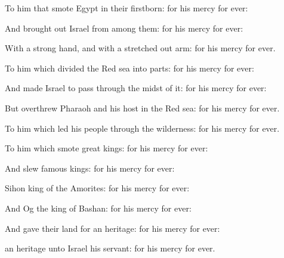 {\Q {}To him that
smote
Egypt in their
firstborn: for his
mercy
{} for
ever:


\par }{\Q {}And brought
out
Israel from
among them: for his
mercy
{} for
ever:


\par }{\Q {}With a
strong
hand, and with a stretched
out
arm: for his
mercy
{} for
ever.


\par }{\Q {}To him which
divided the
Red
sea into
parts: for his
mercy
{} for
ever:


\par }{\Q {}And made
Israel to pass
through the
midst of it: for his
mercy
{} for
ever:


\par }{\Q {}But
overthrew
Pharaoh and his
host in the
Red
sea: for his
mercy
{} for
ever.


\par }{\Q {}To him which
led his
people through the
wilderness: for his
mercy
{} for
ever.


\par }{\Q {}To him which
smote
great
kings: for his
mercy
{} for
ever:


\par }{\Q {}And
slew
famous
kings: for his
mercy
{} for
ever:


\par }{\Q {}Sihon
king of the
Amorites: for his
mercy
{} for
ever:


\par }{\Q {}And
Og the
king of
Bashan: for his
mercy
{} for
ever:


\par }{\Q {}And
gave their
land for an
heritage: for his
mercy
{} for
ever:


\par }{\Q {} an
heritage unto
Israel his
servant: for his
mercy
{} for
ever.


\par }{\BB \par }
